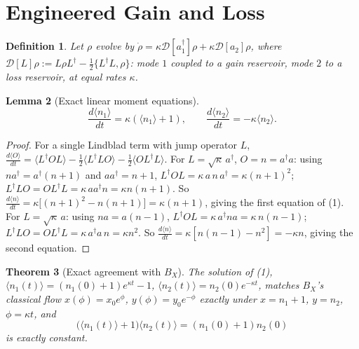 \documentclass[12pt]{amsart}
\theoremstyle{plain}
\newtheorem{theorem}{Theorem}[section]
\newtheorem{lemma}[theorem]{Lemma}
\newtheorem{definition}[theorem]{Definition}
\theoremstyle{remark}
\begin{document}
\section{Engineered Gain and Loss}

\begin{definition}
Let $\rho$ evolve by $\dot\rho=\kappa\mathcal D[a_1^\dagger]\rho+\kappa\mathcal D[a_2]\rho$, where $\mathcal D[L]\rho:=L\rho L^\dagger-\tfrac12\{L^\dagger L,\rho\}$: mode $1$ coupled to a gain reservoir, mode $2$ to a loss reservoir, at equal rates $\kappa$.
\end{definition}

\begin{lemma}[Exact linear moment equations]\label{lem:moments}
\begin{equation}
\frac{d\langle n_1\rangle}{dt}=\kappa(\langle n_1\rangle+1), \qquad \frac{d\langle n_2\rangle}{dt}=-\kappa\langle n_2\rangle. \tag{1}
\end{equation}
\end{lemma}

\begin{proof}
For a single Lindblad term with jump operator $L$, $\frac{d\langle O\rangle}{dt}=\langle L^\dagger OL\rangle-\tfrac12\langle L^\dagger LO\rangle-\tfrac12\langle OL^\dagger L\rangle$. For $L=\sqrt\kappa\,a^\dagger$, $O=n=a^\dagger a$: using $na^\dagger=a^\dagger(n+1)$ and $aa^\dagger=n+1$, $L^\dagger OL=\kappa\,a\,n\,a^\dagger=\kappa(n+1)^2$; $L^\dagger LO=OL^\dagger L=\kappa\,a a^\dagger n=\kappa n(n+1)$. So $\frac{d\langle n\rangle}{dt}=\kappa\big[(n+1)^2-n(n+1)\big]=\kappa(n+1)$, giving the first equation of (1). For $L=\sqrt\kappa\,a$: using $na=a(n-1)$, $L^\dagger OL=\kappa\,a^\dagger n a=\kappa\,n(n-1)$; $L^\dagger LO=OL^\dagger L=\kappa\,a^\dagger a\,n=\kappa n^2$. So $\frac{d\langle n\rangle}{dt}=\kappa[n(n-1)-n^2]=-\kappa n$, giving the second equation.
\end{proof}

\begin{theorem}[Exact agreement with $B_X$]\label{thm:agree}
The solution of (1), $\langle n_1(t)\rangle=(n_1(0)+1)e^{\kappa t}-1$, $\langle n_2(t)\rangle=n_2(0)e^{-\kappa t}$, matches $B_X$'s classical flow $x(\phi)=x_0e^\phi$, $y(\phi)=y_0e^{-\phi}$ exactly under $x=n_1+1$, $y=n_2$, $\phi=\kappa t$, and
\begin{equation}
\big(\langle n_1(t)\rangle+1\big)\langle n_2(t)\rangle = (n_1(0)+1)n_2(0) \tag{2}
\end{equation}
is exactly constant.
\end{theorem}
\end{document}
